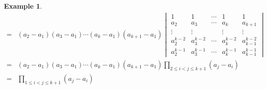 \documentclass{article}
\newtheorem{example}[theorem]{Example}
\begin{document}
\begin{example}
$$\begin{array}{ll}
=& (a_2-a_1)(a_3-a_1)\cdots(a_k-a_1)(a_{k+1}-a_1)
\begin{vmatrix}
1 & 1& \cdots & 1 & 1\\
a_2 & a_3 & \cdots & a_k & a_{k+1} \\
\vdots & \vdots& &\vdots &\vdots \\
a_2^{k-2} & a_3^{k-2} & \cdots & a_k^{k-2} & a_{k-1}^{k-2} \\
a_2^{k-1} & a_3^{k-1} & \cdots & a_k^{k-1} & a_{k-1}^{k-1} 
\end{vmatrix} \\
=& (a_2-a_1)(a_3-a_1)\cdots(a_k-a_1)(a_{k+1}-a_1) \prod\limits_{2\leq i < j \leq k+1}(a_j - a_i) \\
=& \prod\limits_{1 \leq i < j \leq k+1}(a_j - a_i)
\end{array}
$$
\end{example}
\end{document}
